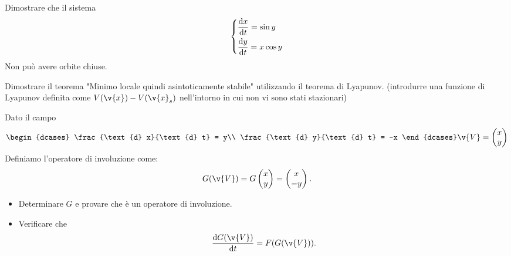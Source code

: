 \begin{ex}[]
    Dimostrare che il sistema
    \[
    \begin{dcases}
    \frac{\text{d} x}{\text{d} t} = \sin y\\
    \frac{\text{d} y}{\text{d} t} = x\cos y
    \end{dcases}
    \]
    Non può avere orbite chiuse.
\end{ex}
\noindent
\begin{ex}[]
    Dimostrare il teorema "Minimo locale quindi asintoticamente stabile" utilizzando il teorema di Lyapunov. (introdurre una funzione di Lyapunov definita come $V(\v{x}) - V(\v{x}_s)$ nell'intorno in cui non vi sono stati stazionari) 
\end{ex}
\noindent
\begin{ex}[]
    Dato il campo
    \[
    \begin{dcases}
    \frac{\text{d} x}{\text{d} t} = y\\
    \frac{\text{d} y}{\text{d} t} = -x	
    \end{dcases}
    \v{V}= \begin{pmatrix} x \\  y\end{pmatrix}	
    \]
    Definiamo l'operatore di involuzione come:
    \[
	G(\v{V}) = G\begin{pmatrix} x \\ y \end{pmatrix} = \begin{pmatrix} x \\ -y \end{pmatrix} 
    .\] 
    \begin{itemize}
        \item Determinare $G$ e provare che è un operatore di involuzione.
	\item Verificare che 
	    \[
		\frac{\text{d} G(\v{V}) }{\text{d} t} = F(G(\v{V}) ) 
	    .\] 
    \end{itemize}
\end{ex}
\noindent

